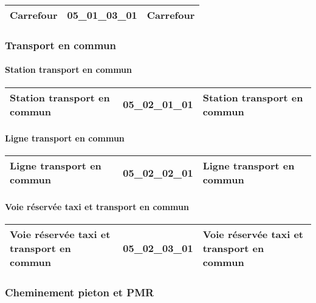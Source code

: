 \documentclass[12pt,titlepage,oneside]{book}
\begin{document}
\renewcommand{\arraystretch}{1.2}
\begin{supertabular}{|p{10cm}|c|p{15cm}|}
 Carrefour & 05\_01\_03\_01 & Carrefour\\
\hline
\end{supertabular}

\subsubsection{\large Transport en commun}
\paragraph{Station transport en commun}
\noindent
\vspace{\baselineskip}

\renewcommand{\arraystretch}{1.2}
\begin{supertabular}{|p{10cm}|c|p{15cm}|}
 Station transport en commun & 05\_02\_01\_01 & Station transport en commun\\
\hline
\end{supertabular}


\paragraph{Ligne transport en commun}
\noindent
\vspace{\baselineskip}

\renewcommand{\arraystretch}{1.2}
\begin{supertabular}{|p{10cm}|c|p{15cm}|}
 Ligne transport en commun & 05\_02\_02\_01 & Ligne transport en commun\\
\hline
\end{supertabular}


\paragraph{Voie réservée taxi et transport en commun}
\noindent
\vspace{\baselineskip}

\renewcommand{\arraystretch}{1.2}
\begin{supertabular}{|p{10cm}|c|p{15cm}|}
 Voie réservée taxi et transport en commun & 05\_02\_03\_01 & Voie réservée taxi et transport en commun\\
\hline
\end{supertabular}

\subsubsection{\large Cheminement pieton et PMR}
\end{document}
